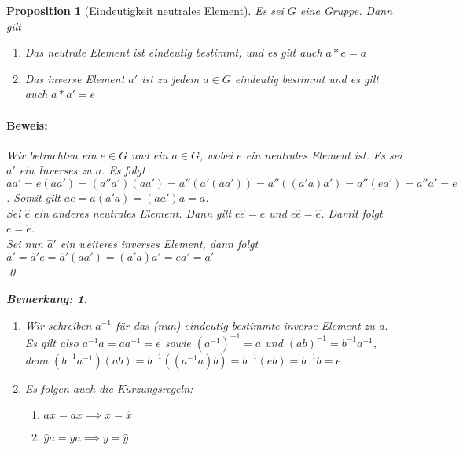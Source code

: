 \documentclass{report}
\theoremstyle{customrem}
\newtheorem*{bemerkung}{Bemerkung\textnormal:}
\theoremstyle{customdef}
\newtheorem{proposition}[definition]{Proposition}
\renewenvironment{proof}{\paragraph{Beweis: }}{\qed}
\theoremstyle{customenv}
\begin{document}
	\begin{proposition}[Eindeutigkeit neutrales Element]
		Es sei \(G\) eine Gruppe. Dann gilt
		\begin{enumerate}
			\itemsep0cm
			\item Das neutrale Element ist eindeutig bestimmt, und es gilt auch \(a \ast e = a\)
			\item Das inverse Element \(a'\) ist zu jedem \(a \in G\) eindeutig bestimmt und es gilt auch \(a \ast a' = e\)
		\end{enumerate}

		\begin{proof}
			Wir betrachten ein \(e \in G\) und ein \(a \in G\), wobei \(e\) ein neutrales Element ist. Es sei \(a'\) ein Inverses zu \(a\). Es folgt
			\(a a' = e (a a') = (a'' a') (a a') = a'' (a' (a a')) = a'' ((a' a) a') = a'' (e a') = a'' a' = e\).
			Somit gilt \(a e = a (a' a) = (a a') a = a\).\\

			Sei \(\hat{e}\) ein anderes neutrales Element. Dann gilt \(e \hat{e} = e\) und \(e \hat{e} = \hat{e}\). Damit folgt \(e = \hat{e}\).\\

			Sei nun \(\hat{a}'\) ein weiteres inverses Element, dann folgt
			\(\hat{a}' = \hat{a}' e = \hat{a}' (aa') = (\hat{a}'a)a' = ea' = a'\)\\
		\end{proof}\vspace{.25cm}
		\begin{bemerkung} \( \)
			\begin{enumerate}
				\itemsep0cm
				\item Wir schreiben \(a^{-1}\) für das (nun) eindeutig bestimmte inverse Element zu a.
				Es gilt also \(a^{-1}a = aa^{-1} = e\) sowie \((a^{-1})^{-1} = a\) und \((ab)^{-1} = b^{-1}a^{-1}\), denn \((b^{-1}a^{-1})(ab) = b^{-1}((a^{-1}a)b) = b^{-1}(eb) = b^{-1}b = e\)
				\item Es folgen auch die Kürzungsregeln:
				\begin{enumerate}[leftmargin=4.25cm]
					\itemsep0cm
					\item \(a \hat{x} = ax \implies x = \hat{x}\)
					\item \(\hat{y}a = ya \implies y = \hat{y}\)
				\end{enumerate}
			\end{enumerate}
		\end{bemerkung}
	\end{proposition}
\end{document}
